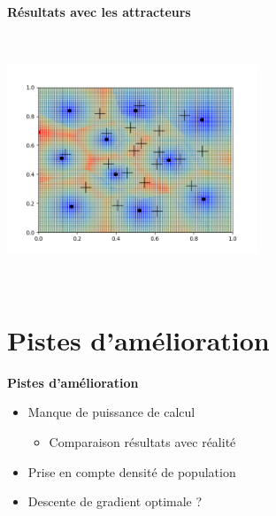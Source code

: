\documentclass[10pt]{beamer}
\begin{document}
\begin{frame}[noframenumbering]{\textbf{Résultats avec les attracteurs}}

    \begin{center}
        \includegraphics[height=7.5cm, width=7.5cm]{../../Figure_10pt_paris.png}
    \end{center}

\end{frame}


\section{Pistes d'amélioration}
\begin{frame}{\textbf{Pistes d'amélioration}}

    \begin{itemize}
        \item Manque de puissance de calcul
        \begin{itemize}
            \item Comparaison résultats avec réalité
        \end{itemize}
        \item Prise en compte densité de population
        \item Descente de gradient optimale ?
    \end{itemize}

\end{frame}
\end{document}
